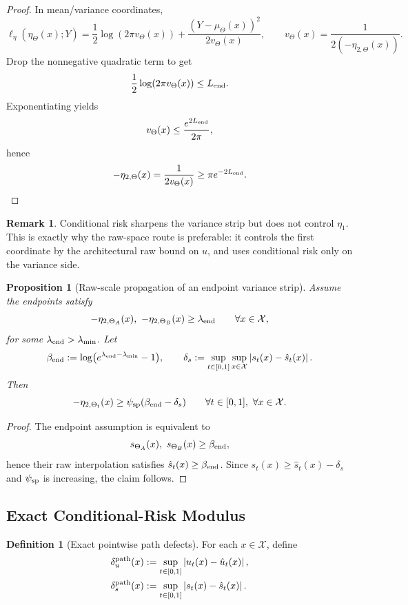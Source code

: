 \documentclass[11pt]{article}
\newtheorem{proposition}[theorem]{Proposition}
\theoremstyle{definition}
\newtheorem{definition}[theorem]{Definition}
\newtheorem{remark}[theorem]{Remark}
\newcommand{\abs}[1]{\left\lvert #1 \right\rvert}
\newcommand{\mc}[1]{\mathcal{#1}}
\begin{document}
\begin{proof}
In mean/variance coordinates,
\[
  \ell_\eta(\eta_\Theta(x);Y)
  =
  \frac12\log(2\pi v_\Theta(x))
  +
  \frac{(Y-\mu_\Theta(x))^2}{2v_\Theta(x)},
  \qquad
  v_\Theta(x)=\frac{1}{2(-\eta_{2,\Theta}(x))}.
\]
Drop the nonnegative quadratic term to get
\[
  \frac12\log(2\pi v_\Theta(x))\le L_{\rm end}.
\]
Exponentiating yields
\[
  v_\Theta(x)\le \frac{e^{2L_{\rm end}}}{2\pi},
\]
hence
\[
  -\eta_{2,\Theta}(x)=\frac{1}{2v_\Theta(x)}\ge \pi e^{-2L_{\rm end}}.
\]
\end{proof}

\begin{remark}
Conditional risk sharpens the variance strip but does not control $\eta_1$.
This is exactly why the raw-space route is preferable: it controls the first
coordinate by the architectural raw bound on $u$, and uses conditional risk
only on the variance side.
\end{remark}

\begin{proposition}[Raw-scale propagation of an endpoint variance strip]
\label{prop:raw-scale-strip-propagation}
Assume the endpoints satisfy
\[
  -\eta_{2,\Theta_A}(x),\ -\eta_{2,\Theta_B}(x)\ge \lambda_{\rm end}
  \qquad
  \forall x\in\mc{X},
\]
for some $\lambda_{\rm end}>\lambda_{\min}$. Let
\[
  \beta_{\rm end}:=\log\bigl(e^{\lambda_{\rm end}-\lambda_{\min}}-1\bigr),
  \qquad
  \delta_s:=\sup_{t\in[0,1]}\sup_{x\in\mc{X}}\abs{s_t(x)-\hat s_t(x)}.
\]
Then
\[
  -\eta_{2,\Theta_t}(x)\ge \psi_{\rm sp}(\beta_{\rm end}-\delta_s)
  \qquad
  \forall t\in[0,1],\ \forall x\in\mc{X}.
\]
\end{proposition}

\begin{proof}
The endpoint assumption is equivalent to
\[
  s_{\Theta_A}(x),\ s_{\Theta_B}(x)\ge \beta_{\rm end},
\]
hence their raw interpolation satisfies $\hat s_t(x)\ge \beta_{\rm end}$. Since
$s_t(x)\ge \hat s_t(x)-\delta_s$ and $\psi_{\rm sp}$ is increasing, the claim
follows.
\end{proof}

\subsection{Exact Conditional-Risk Modulus}

\begin{definition}[Exact pointwise path defects]
\label{def:exact-pointwise-path-defects}
For each $x\in\mc{X}$, define
\begin{align}
  \delta_u^{\rm path}(x)
  &:=
  \sup_{t\in[0,1]}\abs{u_t(x)-\hat u_t(x)},
  \label{eq:delta-u-path}
  \\
  \delta_s^{\rm path}(x)
  &:=
  \sup_{t\in[0,1]}\abs{s_t(x)-\hat s_t(x)}.
  \label{eq:delta-s-path}
\end{align}
\end{definition}
\end{document}
